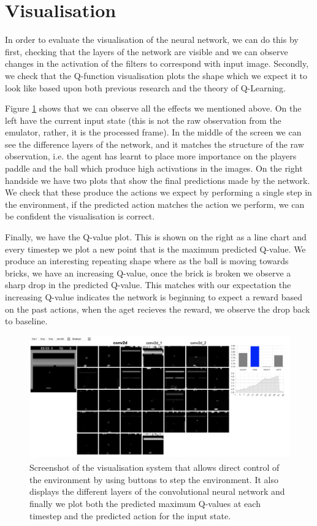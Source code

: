 \section{Visualisation}
In order to evaluate the visualisation of the neural network, we can do this by first, checking that the layers of the network are visible and we can observe changes in the activation of the filters to correspond with input image. Secondly, we check that the Q-function visualisation plots the shape which we expect it to look like based upon both previous research and the theory of Q-Learning.

Figure \ref{fig:vis_system_screenshot} shows that we can observe all the effects we mentioned above. On the left have the current input state (this is not the raw observation from the emulator, rather, it is the processed frame). In the middle of the screen we can see the difference layers of the network, and it matches the structure of the raw observation, i.e. the agent has learnt to place more importance on the players paddle and the ball which produce high activations in the images. On the right handside we have two plots that show the final predictions made by the network. We check that these produce the actions we expect by performing a single step in the environment, if the predicted action matches the action we perform, we can be confident the visualisation is correct.

Finally, we have the Q-value plot. This is shown on the right as a line chart and every timestep we plot a new point that is the maximum predicted Q-value. We produce an interesting repeating shape where as the ball is moving towards bricks, we have an increasing Q-value, once the brick is broken we observe a sharp drop in the predicted Q-value. This matches with our expectation the increasing Q-value indicates the network is beginning to expect a reward based on the past actions, when the aget recieves the reward, we observe the drop back to baseline.

\begin{figure}[htbp]
  \centering
  \includegraphics[width=1.0\textwidth]{chapters/chapter5/images/vis_screen.png}
  \caption[Screenshot of visualisation system]{Screenshot of the visualisation system that allows direct control of the environment by using buttons to step the environment. It also displays the different layers of the convolutional neural network and finally we plot both the predicted maximum Q-values at each timestep and the predicted action for the input state.
    \label{fig:vis_system_screenshot}
  }
\end{figure}